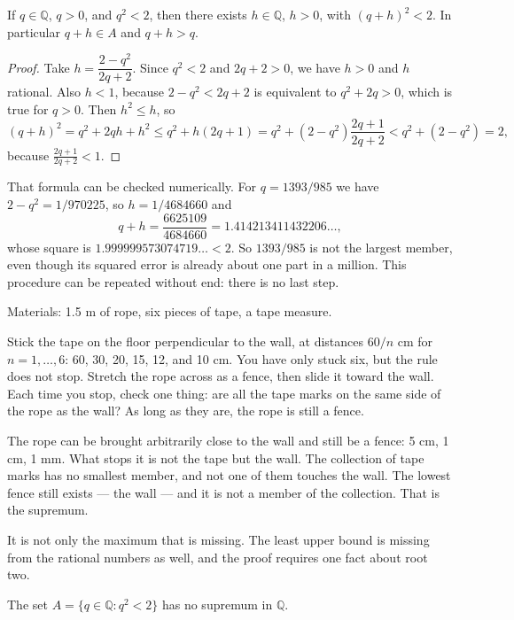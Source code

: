 \begin{lemma}
If $q\in\mathbb{Q}$, $q>0$, and $q^2<2$, then there exists $h\in\mathbb{Q}$, $h>0$,
with $(q+h)^2<2$. In particular $q+h\in A$ and $q+h>q$.
\end{lemma}

\begin{proof}
Take $h=\dfrac{2-q^2}{2q+2}$. Since $q^2<2$ and $2q+2>0$, we have $h>0$ and $h$
rational. Also $h<1$, because $2-q^2<2q+2$ is equivalent to $q^2+2q>0$, which is true
for $q>0$. Then $h^2\le h$, so
\[
(q+h)^2=q^2+2qh+h^2\le q^2+h(2q+1)
=q^2+(2-q^2)\frac{2q+1}{2q+2}<q^2+(2-q^2)=2,
\]
because $\frac{2q+1}{2q+2}<1$.
\end{proof}

That formula can be checked numerically. For $q=1393/985$ we have $2-q^2=1/970225$, so
$h=1/4684660$ and
\[
q+h=\frac{6625109}{4684660}=1.414213411432206\ldots,
\]
whose square is $1.999999573074719\ldots<2$. So $1393/985$ is not the largest member,
even though its squared error is already about one part in a million. This procedure
can be repeated without end: there is no last step.

\begin{tangan}
Materials: 1.5 m of rope, six pieces of tape, a tape measure.

Stick the tape on the floor perpendicular to the wall, at distances $60/n$ cm for
$n=1,\ldots,6$: 60, 30, 20, 15, 12, and 10 cm. You have only stuck six, but the rule
does not stop. Stretch the rope across as a fence, then slide it toward the wall. Each
time you stop, check one thing: are all the tape marks on the same side of the rope as
the wall? As long as they are, the rope is still a fence.

The rope can be brought arbitrarily close to the wall and still be a fence: 5 cm, 1 cm,
1 mm. What stops it is not the tape but the wall. The collection of tape marks has no
smallest member, and not one of them touches the wall. The lowest fence still exists
--- the wall --- and it is not a member of the collection. That is the supremum.
\end{tangan}

It is not only the maximum that is missing. The least upper bound is missing from the
rational numbers as well, and the proof requires one fact about root two.

\begin{proposisi}
The set $A=\{q\in\mathbb{Q}: q^2<2\}$ has no supremum in $\mathbb{Q}$.
\end{proposisi}

